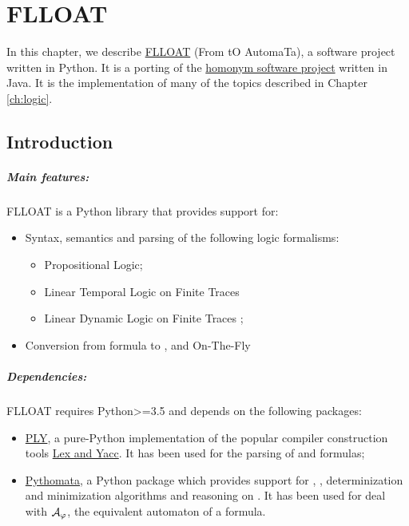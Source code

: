 \chapter{FLLOAT}\label{ch:flloat}
In this chapter, we describe \href{https://github.com/MarcoFavorito/flloat.git}{FLLOAT} (From \LLf tO AutomaTa), a software project written in Python. It is a porting of the \href{https://github.com/RiccardoDeMasellis/FLLOAT}{homonym software project} written in Java. It is the implementation of many of the topics described in Chapter \ref{ch:logic}. 

\section{Introduction}
\paragraph{Main features:} FLLOAT is a Python library that provides support for:
\begin{itemize}
	
	\item Syntax, semantics and parsing of the following logic formalisms:
	\begin{itemize}
		\item Propositional Logic;
		\item Linear Temporal Logic on Finite Traces \LTLf
		\item Linear Dynamic Logic on Finite Traces \LDLf;
	\end{itemize}
	\item Conversion from \LLf formula to \NFA, \DFA and \DFA On-The-Fly
	
\end{itemize}

\paragraph{Dependencies:} FLLOAT requires Python>=3.5 and depends on the following packages:
\begin{itemize}
	\item \href{http://www.dabeaz.com/ply/ply.html}{PLY}, a pure-Python implementation of the popular compiler construction tools \href{http://dinosaur.compilertools.net/}{Lex and Yacc}. It has been used for the parsing of \PL and \LLf formulas;
	\item \href{https://github.com/MarcoFavorito/pythomata}{Pythomata}, a Python package which provides support for \NFA, \DFA, determinization and minimization algorithms and reasoning on \DFAs. It has been used for deal with $\mathcal{A}_\varphi$, the equivalent automaton of a \LLf formula.
\end{itemize}

